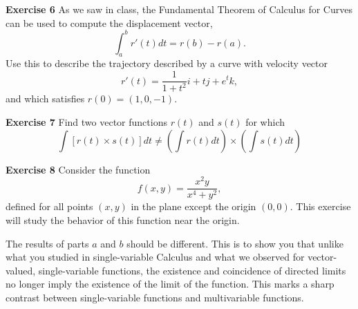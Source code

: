 \documentclass[12pt,oneside]{exam}
\newenvironment{exercise}[1]{\vspace{.1in}\noindent\textbf{Exercise #1 \hspace{.05em}}}{}
\begin{document}
\begin{exercise}{6}
As we saw in class, the Fundamental Theorem of Calculus for Curves can be used to compute the displacement vector, 
\begin{equation*}
\int_{a}^{b} r'(t) dt = r(b)-r(a).
\end{equation*}
Use this to describe the trajectory described by a curve with velocity vector 
\begin{equation*}
r'(t)=\frac{1}{1+t^2} i + tj + e^tk, 
\end{equation*}
and which satisfies $r(0)=(1,0,-1)$. 
\end{exercise}

\begin{exercise}{7}
Find two vector functions $r(t)$ and $s(t)$ for which 
\begin{equation*}
\int[ r(t) \times s(t)] dt  \neq \left(\int r(t) dt \right) \times \left( \int s(t) dt \right)
\end{equation*}
\end{exercise}

\begin{exercise}{8}
Consider the function 
\begin{equation*}
f(x,y)=\frac{x^2y}{x^4+y^2},
\end{equation*}
defined for all points $(x,y)$ in the plane except the origin $(0,0)$. This exercise will study the behavior of this function near the origin. 


The results of parts $a$ and $b$ should be different. This is to show you that unlike what you studied in single-variable Calculus and what we observed for vector-valued, single-variable functions, the existence and coincidence of directed limits no longer imply the existence of the limit of the function. This marks a sharp contrast between single-variable functions and multivariable functions.
\end{exercise}
\end{document}
